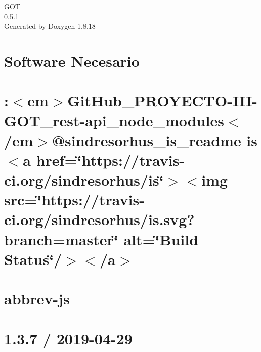 \let\mypdfximage\pdfximage\def\pdfximage{\immediate\mypdfximage}\documentclass[twoside]{book}
\newcommand{\+}{\discretionary{\mbox{\scriptsize$\hookleftarrow$}}{}{}}
\newcommand{\clearemptydoublepage}{%
  \newpage{\pagestyle{empty}\cleardoublepage}%
}
\begin{document}
\hypersetup{pageanchor=false,
             bookmarksnumbered=true,
             pdfencoding=unicode
            }
\begin{titlepage}
\vspace*{7cm}
\begin{center}%
{\Large G\+OT \\[1ex]\large 0.\+5.\+1 }\\
\vspace*{1cm}
{\large Generated by Doxygen 1.8.18}\\
\end{center}
\end{titlepage}
\clearemptydoublepage
{}
\tableofcontents
\clearemptydoublepage
{}
\hypersetup{pageanchor=true}

\chapter{Software Necesario}
\label{md__c_1__git_hub__p_r_o_y_e_c_t_o-_i_i_i-_g_o_t__r_e_a_d_m_e}

\chapter{\+:$<$em$>$Git\+Hub\+\_\+\+P\+R\+O\+Y\+E\+C\+T\+O-\/\+I\+I\+I-\/\+G\+O\+T\+\_\+rest-\/api\+\_\+node\+\_\+modules$<$/em$>$@sindresorhus\+\_\+is\+\_\+readme is $<$a href=\char`\"{}https\+://travis-\/ci.\+org/sindresorhus/is\char`\"{}$>$$<$img src=\char`\"{}https\+://travis-\/ci.\+org/sindresorhus/is.\+svg?branch=master\char`\"{} alt=\char`\"{}\+Build Status\char`\"{}/$>$$<$/a$>$}
\label{md__c}

\chapter{abbrev-\/js}
\label{md__c_1__git_hub__p_r_o_y_e_c_t_o-_i_i_i-_g_o_t_rest-api_node_modules_abbrev__r_e_a_d_m_e}

\chapter{1.3.7 / 2019-\/04-\/29}
\label{md__c_1__git_hub__p_r_o_y_e_c_t_o-_i_i_i-_g_o_t_rest-api_node_modules_accepts__h_i_s_t_o_r_y}

\end{document}
